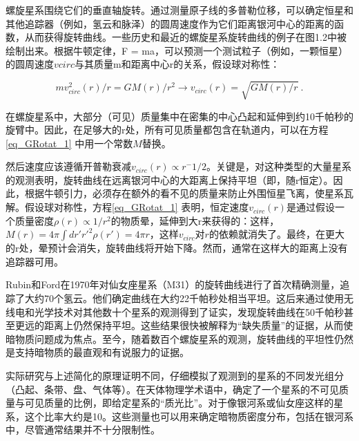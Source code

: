 
螺旋星系围绕它们的垂直轴旋转。通过测量原子线的多普勒位移，可以确定恒星和其他追踪器（例如，氢云和脉泽）的圆周速度作为它们距离银河中心的距离的函数，从而获得旋转曲线。一些历史和最近的螺旋星系旋转曲线的例子在图1.2中被绘制出来。根据牛顿定律，F = ma，可以预测一个测试粒子（例如，一颗恒星）的圆周速度$vcirc$与其质量m和距离中心r的关系，假设球对称性：

\begin{equation}\label{eq_GRotat_1}
mv^2_{circ}(r) / r = GM(r) / r^2 \rightarrow v_{circ}(r) = \sqrt{GM(r) / r} ~.
\end{equation}


在螺旋星系中，大部分（可见）质量集中在密集的中心凸起和延伸到约10千帕秒的旋臂中。因此，在足够大的r处，所有可见质量都包含在轨道内，可以在方程\autoref{eq_GRotat_1} 中用一个常数$M$替换。

然后速度应该遵循开普勒衰减$v_{circ}(r) \propto r^-1/2$。关键是，对这种类型的大量星系的观测表明，旋转曲线在远离银河中心的大距离上保持平坦（即，随r恒定）。因此，根据牛顿引力，必须存在额外的看不见的质量来防止外围恒星飞离，使星系瓦解。假设球对称性，方程\autoref{eq_GRotat_1} 表明，恒定速度$v_{circ}(r)$是通过假设一个质量密度$\rho(r) \propto 1/r^2$的物质晕，延伸到大r来获得的：这样，$M(r) = 4 \pi \int dr' r'^2 \rho(r') = 4\pi r$，这样$v_{circ}$对$r$的依赖就消失了。最终，在更大的r处，晕预计会消失，旋转曲线将开始下降。然而，通常在这样大的距离上没有追踪器可用。

Rubin和Ford在1970年对仙女座星系（M31）的旋转曲线进行了首次精确测量，追踪了大约70个氢云。他们确定曲线在大约22千帕秒处相当平坦。这后来通过使用无线电和光学技术对其他数十个星系的观测得到了证实，发现旋转曲线在50千帕秒甚至更远的距离上仍然保持平坦。这些结果很快被解释为“缺失质量”的证据，从而使暗物质问题成为焦点。至今，随着数百个螺旋星系的观测，旋转曲线的平坦性仍然是支持暗物质的最直观和有说服力的证据。

实际研究与上述简化的原理证明不同，仔细模拟了观测到的星系的不同发光组分（凸起、条带、盘、气体等）。在天体物理学术语中，确定了一个星系的不可见质量与可见质量的比例，即给定星系的“质光比”。对于像银河系或仙女座这样的星系，这个比率大约是10。这些测量也可以用来确定暗物质密度分布，包括在银河系中，尽管通常结果并不十分限制性。